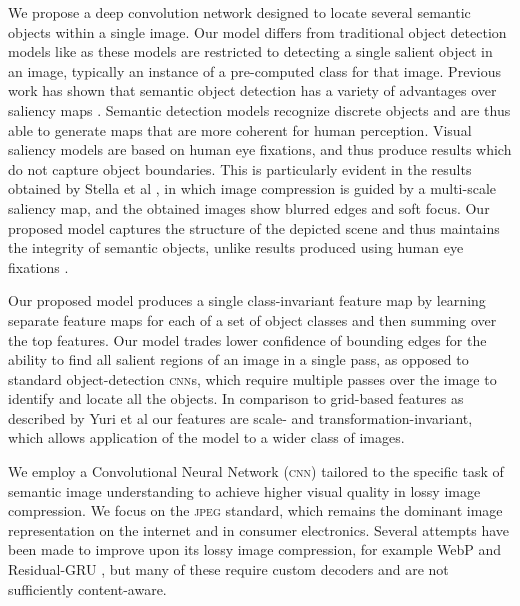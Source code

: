 We propose a deep convolution network designed to locate several semantic objects within a single image.
Our model differs from traditional object detection models like \cite{xxx_dai2016r} \cite{xxx_girshick2014rich} as these models are restricted to detecting a single salient object in an image, typically an instance of a pre-computed class for that image.
Previous work has shown that semantic object detection has a variety of advantages over saliency maps \cite{xxx_mnih2014recurrent} \cite{xxx_zund2013content}. Semantic detection models recognize discrete objects and are thus able to generate maps that are more coherent for human perception.
Visual saliency models are based on human eye fixations, and thus produce results which do not capture object boundaries.
This is particularly evident in the results obtained by Stella et al \cite{xxx_stella2009image}, in which image compression is guided by a multi-scale saliency map, and the obtained images show blurred edges and soft focus.
Our proposed model captures the structure of the depicted scene and thus maintains the integrity of semantic objects, unlike results produced using human eye fixations \cite{xxx_liu2015predicting}.


Our proposed model produces a single class-invariant feature map by learning separate feature maps for each of a set of object classes and then summing over the top features.
Our model trades lower confidence of bounding edges for the ability to find all salient regions of an image in a single pass, as opposed to standard object-detection \textsc{cnn}s, which require multiple passes over the image to identify and locate all the objects.
In comparison to grid-based features as described by Yuri et al \cite{xxx_reznik2013coding} our features are scale- and transformation-invariant, which allows application of the model to a wider class of images.

We employ a Convolutional Neural Network (\textsc{cnn}) tailored to the specific task of semantic image understanding to achieve higher visual quality in lossy image compression.
We focus on the \textsc{jpeg} standard, which remains the dominant image representation on the internet and in consumer electronics. 
Several attempts have been made to improve upon its lossy image compression, for example WebP \cite{xxx_ginesu2012objective} and Residual-GRU \cite{xxx_toderici2016full}, but many of these require custom decoders and are not sufficiently content-aware.


